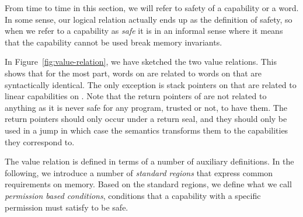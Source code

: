 \begin{jversion}
From time to time in this section, we will refer to safety of a capability or a word.
In some sense, our logical relation actually ends up as the definition of safety, so when we refer to a capability as \emph{safe} it is in an informal sense where it means that the capability cannot be used break memory invariants. 

In Figure~\ref{fig:value-relation}, we have sketched the two value relations.
This shows that for the most part, words on \srccm{} are related to words on \trgcm{} that are syntactically identical.
The only exception is stack pointers on \srccm{} that are related to linear capabilities on \trgcm{}.
Note that the return pointers of \srccm{} are not related to anything as it is never safe for any program, trusted or not, to have them.
The \srccm{} return pointers should only occur under a return seal, and they should only be used in a jump in which case the \srccm{} semantics transforms them to the capabilities they correspond to.

The value relation is defined in terms of a number of auxiliary definitions.
In the following, we introduce a number of \emph{standard regions} that express common requirements on memory. Based on the standard regions, we define what we call \emph{permission based conditions}, conditions that a capability with a specific permission must satisfy to be safe.





\end{jversion}
